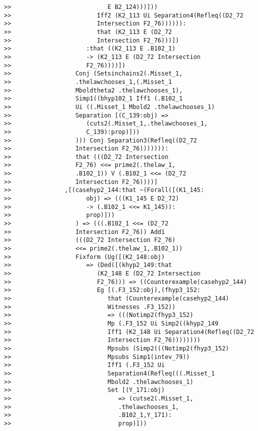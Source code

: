 \documentclass[12pt]{article}
\begin{document}
\begin{verbatim}
>>                           E B2_124)))]))
>>                        Iff2 (K2_113 Ui Separation4(Refleq((D2_72
>>                        Intersection F2_76)))))):
>>                        that (K2_113 E (D2_72
>>                        Intersection F2_76)))])
>>                     :that ((K2_113 E .B102_1)
>>                     -> (K2_113 E (D2_72 Intersection
>>                     F2_76))))])
>>                  Conj (Setsinchains2(.Misset_1,
>>                  .thelawchooses_1,(.Misset_1
>>                  Mboldtheta2 .thelawchooses_1),
>>                  Simp1((bhyp102_1 Iff1 (.B102_1
>>                  Ui ((.Misset_1 Mbold2 .thelawchooses_1)
>>                  Separation [(C_139:obj) =>
>>                     (cuts2(.Misset_1,.thelawchooses_1,
>>                     C_139):prop)]))
>>                  ))) Conj Separation3(Refleq((D2_72
>>                  Intersection F2_76))))))):
>>                  that (((D2_72 Intersection
>>                  F2_76) <<= prime2(.thelaw_1,
>>                  .B102_1)) V (.B102_1 <<= (D2_72
>>                  Intersection F2_76))))]
>>               ,[(casehyp2_144:that ~(Forall([(K1_145:
>>                     obj) => (((K1_145 E D2_72)
>>                     -> (.B102_1 <<= K1_145)):
>>                     prop)]))
>>                  ) => (((.B102_1 <<= (D2_72
>>                  Intersection F2_76)) Add1
>>                  (((D2_72 Intersection F2_76)
>>                  <<= prime2(.thelaw_1,.B102_1))
>>                  Fixform (Ug([(K2_148:obj)
>>                     => (Ded([(khyp2_149:that
>>                        (K2_148 E (D2_72 Intersection
>>                        F2_76))) => ((Counterexample(casehyp2_144)
>>                        Eg [(.F3_152:obj),(fhyp3_152:
>>                           that (Counterexample(casehyp2_144)
>>                           Witnesses .F3_152))
>>                           => (((Notimp2(fhyp3_152)
>>                           Mp (.F3_152 Ui Simp2((khyp2_149
>>                           Iff1 (K2_148 Ui Separation4(Refleq((D2_72
>>                           Intersection F2_76))))))))
>>                           Mpsubs (Simp2(((Notimp2(fhyp3_152)
>>                           Mpsubs Simp1(intev_79))
>>                           Iff1 (.F3_152 Ui
>>                           Separation4(Refleq(((.Misset_1
>>                           Mbold2 .thelawchooses_1)
>>                           Set [(Y_171:obj)
>>                              => (cutse2(.Misset_1,
>>                              .thelawchooses_1,
>>                              .B102_1,Y_171):
>>                              prop)]))

\end{verbatim}
\end{document}
